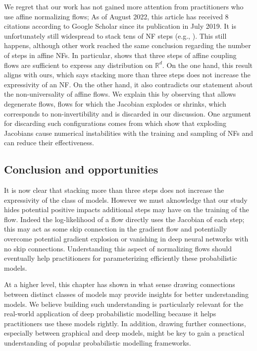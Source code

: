 We regret that our work has not gained more attention from practitioners who use affine normalizing flows; As of August 2022, this article has received $8$ citations according to Google Scholar since its publication in July 2019. It is unfortunately still widespread to stack tens of NF steps (e.g., \citep{daxamortized}). This still happens, although other work reached the same conclusion regarding the number of steps in affine NFs. In particular, \citet{koehler2021representational} shows that three steps of affine coupling flows are sufficient to express any distribution on $\mathbb{R}^d$. On the one hand, this result aligns with ours, which says stacking more than three steps does not increase the expressivity of an NF.
On the other hand, it also contradicts our statement about the non-universality of affine flows. We explain this by observing that \citet{koehler2021representational} allows degenerate flows, flows for which the Jacobian explodes or shrinks, which corresponds to non-invertibility and is discarded in our discussion. One argument for discarding such configurations comes from \citet{behrmann2021understanding} which show that exploding Jacobians cause numerical instabilities with the training and sampling of NFs and can reduce their effectiveness.

\subsection{Conclusion and opportunities}
It is now clear that stacking more than three steps does not increase the expressivity of the class of models. However we must aknowledge that our study hides potential positive impacts additional steps may have on the training of the flow. Indeed the log-likelihood of a flow directly uses the Jacobian of each step; this may act as some skip connection in the gradient flow and potentially overcome potential gradient explosion or vanishing in deep neural networks with no skip connections. Understanding this aspect of normalizing flows should eventually help practitioners for parameterizing efficiently these probabilistic models.

At a higher level, this chapter has shown in what sense drawing connections between distinct classes of models may provide insights for better understanding models. We believe building such understanding is particularly relevant for the real-world application of deep probabilistic modelling because it helps practitioners use these models rightly. In addition, drawing further connections, especially between graphical and deep models, might be key to gain a practical understanding of popular probabilistic modelling frameworks.
%
